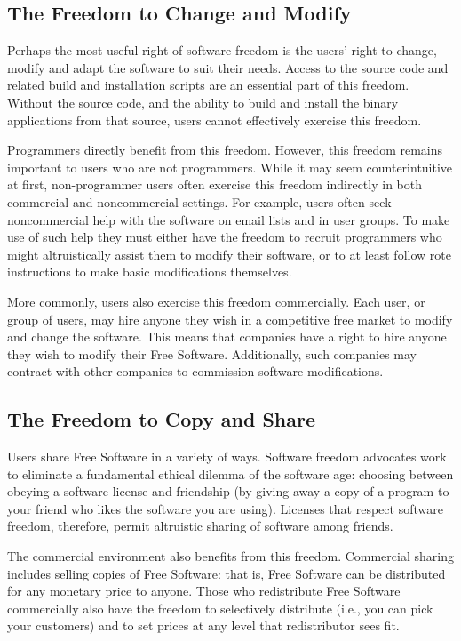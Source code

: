 \subsection{The Freedom to Change and Modify}

Perhaps the most useful right of software freedom is the users' right to
change, modify and adapt the software to suit their needs.  Access to the
source code and related build and installation scripts are an essential part
of this freedom.  Without the source code, and the ability to build and
install the binary applications from that source, users cannot effectively
exercise this freedom.

Programmers directly benefit from this freedom.  However, this freedom
remains important to users who are not programmers.  While it may seem
counterintuitive at first, non-programmer users often exercise this freedom
indirectly in both commercial and noncommercial settings.  For example, users
often seek noncommercial help with the software on email lists and in user
groups.  To make use of such help they must either have the freedom to
recruit programmers who might altruistically assist them to modify their
software, or to at least follow rote instructions to make basic modifications
themselves.

More commonly, users also exercise this freedom commercially.  Each user, or
group of users, may hire anyone they wish in a competitive free market to
modify and change the software.  This means that companies have a right to
hire anyone they wish to modify their Free Software.  Additionally, such
companies may contract with other companies to commission software
modifications.

\subsection{The Freedom to Copy and Share}

Users share Free Software in a variety of ways. Software freedom advocates
work to eliminate a fundamental ethical dilemma of the software age: choosing
between obeying a software license and friendship (by giving away a copy of a
program to your friend who likes the software you are using). Licenses that
respect software freedom, therefore, permit altruistic sharing of software
among friends.

The commercial environment also benefits from this freedom.  Commercial sharing
includes selling copies of Free Software: that is, Free Software can
be distributed for any monetary
price to anyone.  Those who redistribute Free Software commercially also have
the freedom to selectively distribute (i.e., you can pick your customers) and
to set prices at any level that redistributor sees fit.

